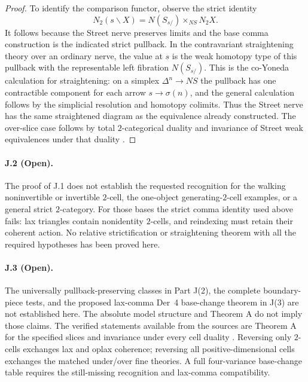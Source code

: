 \begin{proof}
To identify the comparison functor, observe the strict identity
\[
 N_2(s\backslash X)
    =N(S_{s/})\times_{NS}N_2X.
\]
It follows because the Street nerve preserves limits and the
base comma construction is the indicated strict pullback.
In the contravariant straightening theory over an ordinary
nerve, the value at $s$ is the weak homotopy type of this
pullback with the representable left fibration $N(S_{s/})$.
This is the co-Yoneda calculation for straightening: on a
simplex $\Delta^n\to NS$ the pullback has one contractible
component for each arrow $s\to\sigma(n)$, and the general
calculation follows by the simplicial resolution and homotopy
colimits. Thus the Street nerve has the same straightened
diagram as the equivalence already constructed. The over-slice
case follows by total $2$-categorical duality and invariance of
Street weak equivalences under that duality \citep[Theorem 6.6]{GHIJAraMaltsiniotis2022}.
\end{proof}

\paragraph{J.2 (Open).}
The proof of J.1 does not establish the requested recognition
for the walking noninvertible or invertible $2$-cell, the
one-object generating-$2$-cell examples, or a general strict
$2$-category. For those bases the strict comma identity used
above fails: lax triangles contain nonidentity $2$-cells, and
reindexing must retain their coherent action. No relative
strictification or straightening theorem with all the required
hypotheses has been proved here.

\paragraph{J.3 (Open).}
The universally pullback-preserving classes in Part J(2), the
complete boundary-piece tests, and the proposed lax-comma Der~4
base-change theorem in J(3) are not established here. The
absolute model structure and Theorem A do not imply those
claims. The verified statements available from the sources
are Theorem A for the specified slices
\citep[Theorem 5.2]{GHIJAraMaltsiniotis2018} and invariance
under every cell duality
\citep[Theorem 6.6]{GHIJAraMaltsiniotis2022}. Reversing only $2$-cells exchanges lax
and oplax coherence; reversing all positive-dimensional cells
exchanges the matched under/over fine theories. A full
four-variance base-change table requires the still-missing
recognition and lax-comma compatibility.

